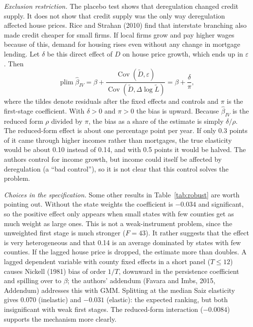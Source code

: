\documentclass[12pt,a4paper]{article}
\begin{document}
\textit{Exclusion restriction.} The placebo test shows that deregulation changed credit supply. It does not show that credit supply was the only way deregulation affected house prices. Rice and Strahan (2010) find that interstate branching also made credit cheaper for small firms. If local firms grow and pay higher wages because of this, demand for housing rises even without any change in mortgage lending. Let $\delta$ be this direct effect of $D$ on house price growth, which ends up in $\varepsilon$. Then
\begin{equation}
  \operatorname{plim} \hat\beta_{IV} = \beta + \frac{\operatorname{Cov}(\tilde D, \varepsilon)}{\operatorname{Cov}(\tilde D, \Delta \log \tilde L)} = \beta + \frac{\delta}{\pi}, \label{eq:bias}
\end{equation}
where the tildes denote residuals after the fixed effects and controls and $\pi$ is the first-stage coefficient. With $\delta>0$ and $\pi>0$ the bias is upward. Because $\hat\beta_{IV}$ is the reduced form $\rho$ divided by $\pi$, the bias as a share of the estimate is simply $\delta/\rho$. The reduced-form effect is about one percentage point per year. If only 0.3 points of it came through higher incomes rather than mortgages, the true elasticity would be about 0.10 instead of 0.14, and with 0.5 points it would be halved. The authors control for income growth, but income could itself be affected by deregulation (a ``bad control''), so it is not clear that this control solves the problem.

\textit{Choices in the specification.} Some other results in Table~\ref{tab:robust} are worth pointing out. Without the state weights the coefficient is $-0.034$ and significant, so the positive effect only appears when small states with few counties get as much weight as large ones. This is not a weak-instrument problem, since the unweighted first stage is much stronger ($F = 43$). It rather suggests that the effect is very heterogeneous and that 0.14 is an average dominated by states with few counties. If the lagged house price is dropped, the estimate more than doubles. A lagged dependent variable with county fixed effects in a short panel ($T \le 12$) causes Nickell (1981) bias of order $1/T$, downward in the persistence coefficient and spilling over to $\beta$; the authors' addendum (Favara and Imbs, 2015, Addendum) addresses this with GMM. Splitting at the median Saiz elasticity gives 0.070 (inelastic) and $-0.031$ (elastic): the expected ranking, but both insignificant with weak first stages. The reduced-form interaction ($-0.0084$) supports the mechanism more clearly.
\end{document}
